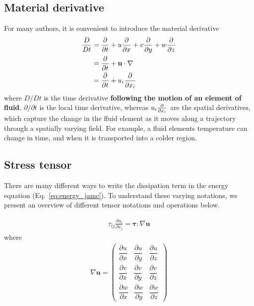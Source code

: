 \documentclass[a4paper]{article}
\begin{document}
\subsection{Material derivative} \label{material_derivative}
For many authors, it is convenient to introduce the material derivative  
\begin{align*}
\frac{D}{Dt} &= \frac{\partial }{\partial t}+ u \frac{\partial }{\partial x} + v \frac{\partial }{\partial y} + w\frac{\partial }{\partial z}\\
&= \frac{\partial }{\partial t} + \textbf{u}\cdot \nabla  \\
&= \frac{\partial }{\partial t} + u_i \pdv{} {x_i} \\
\end{align*}
where $D/Dt$ is the time derivative \textbf{following the motion of an element of fluid}. $\partial/\partial t$ is the local time derivative, 
whereas $u_i \pdv{} {x_i}$ are the spatial derivatives, which capture the change in the fluid element as it moves along a trajectory 
through a spatially varying field. For example, a fluid elements temperature can change in time, and when it is transported into a colder region.  

\subsection{Stress tensor} \label{stress_tensor}
There are many different ways to write the dissipation term in the energy equation (Eq.~\eqref{eq:energy_jamc}). To understand these varying notations, 
we present an overview of different tensor notations and operations below. 

\begin{align*}
\tau	_{ij}\frac{\partial u_i}{\partial x_j} = \boldsymbol{\tau}:\nabla\textbf{u}
\end{align*}
where 
\begin{align*}
\nabla\mathbf{u} =
\begin{pmatrix}
\dfrac{\partial u}{\partial x} & \dfrac{\partial u}{\partial y} & \dfrac{\partial u}{\partial z} \\[2mm]
\dfrac{\partial v}{\partial x} & \dfrac{\partial v}{\partial y} & \dfrac{\partial v}{\partial z} \\[2mm]
\dfrac{\partial w}{\partial x} & \dfrac{\partial w}{\partial y} & \dfrac{\partial w}{\partial z}
\end{pmatrix}
\end{align*}
\end{document}
